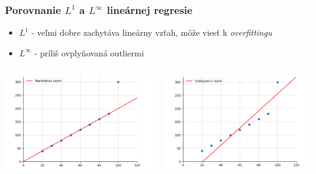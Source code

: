 \documentclass[presentation.tex]{subfiles}
\begin{document}
\begin{frame}
	\frametitle{Porovnanie $L^1$ a $L^{\infty}$ lineárnej regresie}
	
	\begin{itemize}
		\item $L^1$ - veľmi dobre zachytáva lineárny vzťah, môže viesť k \textit{overfittingu}
		\item $L^{\infty}$ - príliš ovplyňovaná outliermi
	\end{itemize}
	
	\begin{columns}
		\begin{column}{0.5\textwidth}
			\centering
			\includegraphics[width=\linewidth]{../report/figs/L1_linear_with_outlier_cropped.png}
		\end{column}
		\begin{column}{0.5\textwidth}
			\centering
			\includegraphics[width=\linewidth]{../report/figs/LInf_linear_with_outlier_cropped.png}
		\end{column}
	\end{columns}
	
\end{frame}
\end{document}
